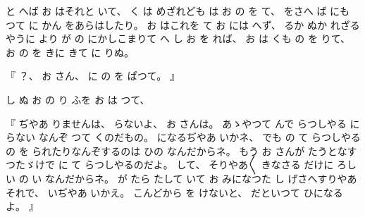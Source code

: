 %
と
へば
お
はそれと
いて、
%
く
は
めざれども
は
お
の
を
て、
%
をさへ
ば
にも
つて
に
かん
をあらはしたり。
%
お
はこれを
て
お
には
へず、
%
るか
ぬか
れざるやうに
より
が
の
にかしこまりて
へ
し
お
を
れば、
%
お
は
くも
の
を
りて、
%
お
の
を
きに
きて
に
りぬ。

%
『
？、
%
お
さん、
%
に
の
を
ぱつて。
』

%
し
ぬ
お
の
り
ふを
お
は
つて、

%
『
ぢやあ
りませんは、
%
らないよ、
%
お
さんは。
%
あゝやつて
んで
らつしやる
に
らない
なんぞ
つて
くのだもの。
%
になるぢやあ
いかネ、
%
でも
の
て
らつしやる
の
を
られたりなんぞするのは
ひの
なんだからネ。
%
もう
お
さんが
たうとなすつたゞけで
に
て
らつしやるのだよ。
%
して、
%
そりやあ〳〵
きなさる%
だけに
ろしい
の
い
なんだからネ。
%
が
たら
たして
いて
お
みになつた
し
げさへすりやあそれで、
%
いぢやあ
いかえ。
%
こんどから
を
けないと、
%
だといつて
ひになるよ。
』

